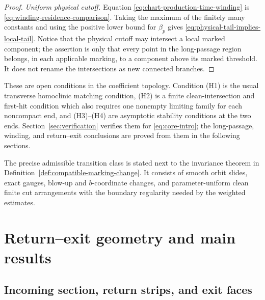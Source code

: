 \documentclass[11pt]{amsart}
\numberwithin{equation}{section}
\theoremstyle{definition}
\theoremstyle{remark}
\begin{document}
\begin{proof}
\emph{Uniform physical cutoff.}
Equation
\eqref{eq:chart-production-time-winding} is
\eqref{eq:winding-residence-comparison}.  Taking the maximum of the
finitely many constants and using the positive lower bound for $\beta_p$
gives \eqref{eq:physical-tail-implies-local-tail}.  Notice that the
physical cutoff may intersect a local marked component; the assertion is
only that every point in the long-passage region belongs, in each applicable
marking, to a component above its marked threshold.  It does not rename
the intersections as new connected branches.
\end{proof}

These are open conditions in the coefficient topology.  Condition
\textup{(H1)} is the usual transverse homoclinic matching condition,
\textup{(H2)} is a finite clean-intersection and first-hit condition which
also requires one nonempty limiting family for each noncompact end, and
\textup{(H3)}--\textup{(H4)} are asymptotic stability conditions at the
two ends.  Section~\ref{sec:verification} verifies them for
\eqref{eq:core-intro}; the long-passage, winding, and return--exit
conclusions are proved from them in the following sections.

The precise admissible transition class is stated next to the invariance
theorem in Definition~\ref{def:compatible-marking-change}.  It consists of
smooth orbit slides, exact gauges, blow-up and $b$-coordinate changes, and
parameter-uniform clean finite cut arrangements with the boundary
regularity needed by the weighted estimates.

\section{Return--exit geometry and main results}
\label{sec:local-domain}

\subsection{Incoming section, return strips, and exit faces}
\end{document}
